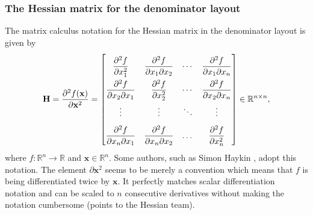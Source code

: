 \documentclass{article}
\begin{document}
\subsubsection{The Hessian matrix for the denominator layout}
The matrix calculus notation for the Hessian matrix in the denominator layout is given by
\begin{align}
    \label{eq:hessian-eq-denomintor}
    \mathbf{H} = \dfrac{\partial^{2} f(\mathbf{x})}{\partial \mathbf{x}^2} = \renewcommand{\arraystretch}{2.2}\begin{bmatrix}
        \dfrac{\partial^{2} f}{\partial x_1^2} & \dfrac{\partial^{2} f}{\partial x_1 \partial x_2} & \cdots & \dfrac{\partial^{2} f}{\partial x_1 \partial x_n} \\
        \dfrac{\partial^{2} f}{\partial x_2 \partial x_1} & \dfrac{\partial^{2} f}{\partial x_2^2} & \cdots & \dfrac{\partial^{2} f}{\partial x_2 \partial x_n} \\
        \vdots & \vdots & \ddots & \vdots \\
        \dfrac{\partial^{2} f}{\partial x_n \partial x_1} & \dfrac{\partial^{2} f}{\partial x_n \partial x_2} & \dots & \dfrac{\partial^{2} f}{\partial x_n^2}
    \end{bmatrix} \in \mathbb{R}^{n \times n},
\end{align}
where \(f: \mathbb{R}^{n} \rightarrow \mathbb{R}\) and \(\mathbf{x} \in \mathbb{R}^{n}\). Some authors, such as Simon Haykin \cite{haykin2009neural}, adopt this notation. The element \(\partial\mathbf{x}^2\) seems to be merely a convention which means that \(f\) is being differentiated twice by \(\mathbf{x}\). It perfectly matches scalar differentiation notation and can be scaled to \(n\) consecutive derivatives without making the notation cumbersome (points to the Hessian team).
\end{document}
